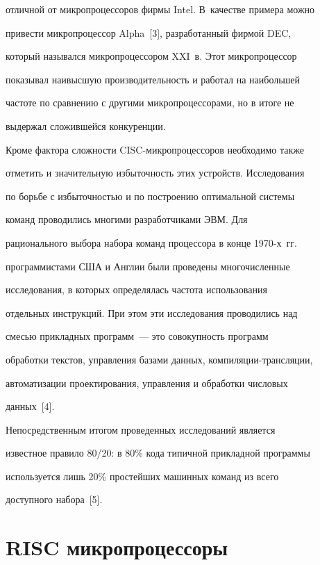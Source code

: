 отличной от микропроцессоров фирмы Intel. В~качестве примера можно 


привести микропроцессор Alpha~[3], разработанный  фирмой DEC, 


который назывался микропроцессором XXI~в. Этот микропроцессор 


показывал наивысшую производительность и работал на наибольшей 


частоте по сравнению с другими микропроцессорами, но в итоге не 


выдержал сложившейся конкуренции.





Кроме фактора сложности CISC-микропроцессоров необходимо также 


отметить и значительную избыточность этих устройств. Исследования 


по борьбе с избыточностью и по построению оптимальной системы 


команд проводились многими разработчиками ЭВМ. Для 


рационального выбора набора команд процессора в конце 1970-х~гг.\ 


программистами США и Англии были проведены многочисленные 


исследования, в которых определялась частота использования 


отдельных инструкций.  При этом эти исследования проводились над 


смесью прикладных программ~--- это совокупность программ 


обработки текстов, управ\-ле\-ния базами данных, компиляции-трансляции, 


автоматизации проектирования, управ\-ле\-ния и обработки числовых 


данных~[4].





Непосредственным итогом проведенных исследований является 


известное правило  80/20: в 80\% кода типичной прикладной программы 


используется лишь 20\% простейших машинных команд из всего 


доступного набора~[5].





\section{RISC микропроцессоры}





